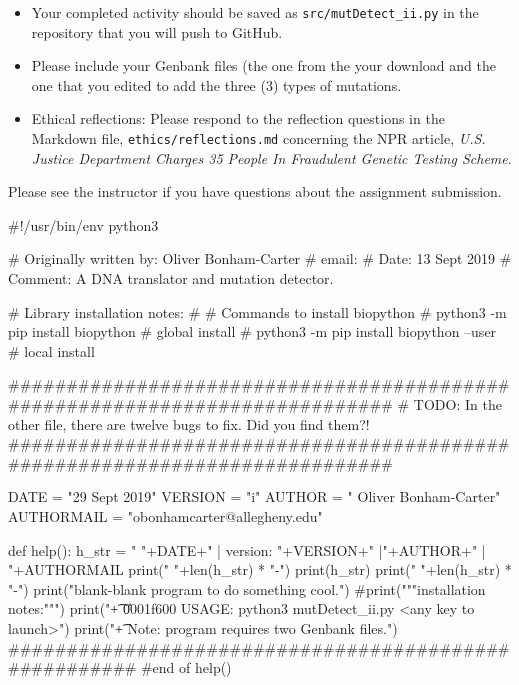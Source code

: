 \begin{itemize}
	\item Your completed activity should be saved as {\color{red} \tt src/mutDetect\_ii.py\color{black}} in the repository that you will push to GitHub.
	\item Please include your Genbank files (the one from the your download and the one that you edited to add the three (3) types of mutations.

	\item Ethical reflections:  Please respond to the reflection questions in the Markdown file, \color{red} {\tt ethics/reflections.md} \color{black} concerning the NPR article, \emph{U.S. Justice Department Charges 35 People In Fraudulent Genetic Testing Scheme}.

	\end{itemize}

\noindent Please see the instructor if you have questions about the assignment submission.








#!/usr/bin/env python3

# Originally written by: Oliver Bonham-Carter
# email:
# Date: 13 Sept 2019
# Comment: A DNA translator and mutation detector.

# Library installation notes:
#
# Commands to install biopython
# python3 -m pip install biopython # global install
# python3 -m pip install biopython –user # local install

############################################################################
# TODO: In the other file, there are twelve bugs to fix. Did you find them?!
############################################################################


DATE = "29 Sept 2019"
VERSION = "i"
AUTHOR = " Oliver Bonham-Carter"
AUTHORMAIL = "obonhamcarter@allegheny.edu"

def help():
        h_str = "   "+DATE+" | version: "+VERSION+" |"+AUTHOR+" | "+AUTHORMAIL
        print("  "+len(h_str) * "-")
        print(h_str)
        print("  "+len(h_str) * "-")
        print("\n\tThe blank-blank program to do something cool.")
        #print("""\n\tLibrary installation notes:""")
        print("\t + \U0001f600  USAGE: python3 mutDetect_ii.py <any key to launch>")
        print("\t + Note: program requires two Genbank files.")
######################################################
#end of help()


